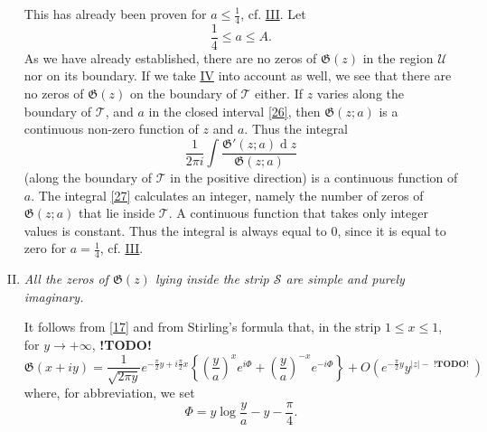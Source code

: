\documentclass{article}
\newcommand{\dd}{\operatorname{d}\!}
\newcommand{\GG}{\mathfrak{G}}
\newcommand{\UU}{\mathscr{U}}
\newcommand{\TT}{\mathscr{T}}
\renewcommand{\SS}{\mathscr{S}}
\renewcommand{\leq}{\leqslant}
\newcommand{\todo}{\textbf{ !TODO! }}
\newcommand{\oldpage}[1]{\marginpar{\phantom{.}\\\footnotesize$\Big\vert$ \textit{p.~#1}}}
\begin{document}
\begin{enumerate}[I.]
    This has already been proven for $a\leq\frac14$, cf. \hyperref[III]{III}.
    Let
    \[
    \label{26}
      \frac14 \leq a \leq A.
    \tag{26}
    \]
    As we have already established, there are no zeros of $\GG(z)$ in the region $\UU$ nor on its boundary.
    If we take \hyperref[IV]{IV} into account as well, we see that there are no zeros of $\GG(z)$ on the boundary of $\TT$ either.
    If $z$ varies along the boundary of $\TT$, and $a$ in the closed interval \cref{26}, then $\GG(z;a)$ is a continuous non-zero function of $z$ and $a$.
    Thus the integral
    \[
    \label{27}
      \frac{1}{2\pi i} \int \frac{\GG'(z;a)\dd z}{\GG(z;a)}
    \tag{27}
    \]
    (along the boundary of $\TT$ in the positive direction) is a continuous function of $a$.
    The integral \cref{27} calculates an integer, namely the number of zeros of $\GG(z;a)$ that lie inside $\TT$.
    A continuous function that takes only integer values is constant.
    Thus the integral is always equal to $0$, since it is equal to zero for $a=\frac14$, cf. \hyperref[III]{III}.
\oldpage{313}
  \item \emph{All the zeros of $\GG(z)$ lying inside the strip $\SS$ are simple and purely imaginary.}
    \label{VI}

    It follows from \cref{17} and from Stirling's formula that, in the strip $1\leq x\leq 1$, for $y\to+\infty$, \todo
    \[
    \label{28}
      \GG(x+iy)
      =
      \frac{1}{\sqrt{2\pi y}} e^{-\frac\pi2 y+ i\frac\pi2 x}
      \left\{
        \left(\frac{y}{a}\right)^x e^{i\Phi} + 
        \left(\frac{y}{a}\right)^{-x} e^{-i\Phi}
      \right\} + O\left(
        e^{-\frac\pi2 y} y^{|z| - \todo}
      \right)
    \tag{28}
    \]
    where, for abbreviation, we set
    \[
    \label{29}
      \Phi = y\log\frac{y}{a} - y - \frac\pi4.
    \tag{29}
    \]
\end{enumerate}




\nocite{*}

\end{document}
